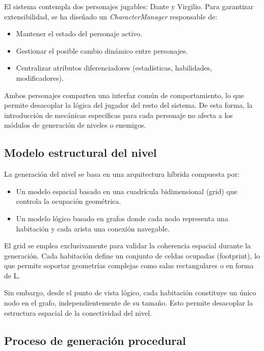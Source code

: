 El sistema contempla dos personajes jugables: Dante y Virgilio. Para garantizar extensibilidad, se ha diseñado un \textit{CharacterManager} responsable de:

\begin{itemize}
    \item Mantener el estado del personaje activo.
    \item Gestionar el posible cambio dinámico entre personajes.
    \item Centralizar atributos diferenciadores (estadísticas, habilidades, modificadores).
\end{itemize}

Ambos personajes comparten una interfaz común de comportamiento, lo que permite desacoplar la lógica del jugador del resto del sistema. De esta forma, la introducción de mecánicas específicas para cada personaje no afecta a los módulos de generación de niveles o enemigos.

\subsection{Modelo estructural del nivel}

La generación del nivel se basa en una arquitectura híbrida compuesta por:

\begin{itemize}
    \item Un modelo espacial basado en una cuadrícula bidimensional (grid) que controla la ocupación geométrica.
    \item Un modelo lógico basado en grafos donde cada nodo representa una habitación y cada arista una conexión navegable.
\end{itemize}

El grid se emplea exclusivamente para validar la coherencia espacial durante la generación. Cada habitación define un conjunto de celdas ocupadas (footprint), lo que permite soportar geometrías complejas como salas rectangulares o en forma de L.

Sin embargo, desde el punto de vista lógico, cada habitación constituye un único nodo en el grafo, independientemente de su tamaño. Esto permite desacoplar la estructura espacial de la conectividad del nivel.

\subsection{Proceso de generación procedural}

